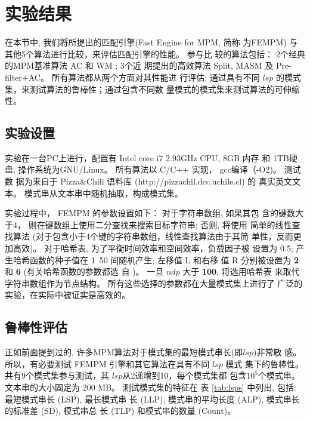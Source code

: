\section{实验结果}
\label{sec:2_experiments}

在本节中, 我们将所提出的匹配引擎(Fast Engine for MPM, 简称
为\textsf{FEMPM}) 与其他5个算法进行比较，来评估匹配引擎的性能。 参与比
较的算法包括： 2个经典的MPM基准算法 \textsf{AC} 和 \textsf{WM} ; 3个近
期提出的高效算法 \textsf{Split},
\textsf{MASM} 及 \textsf{Pre-filter+AC}。 所有算法都从两个方面对其性能进
行评估: 通过具有不同 $lsp$ 的模式集，来测试算法的鲁棒性；通过包含不同数
量模式的模式集来测试算法的可伸缩性。

\subsection{实验设置}


实验在一台PC上进行，配置有 Intel core i7 2.93GHz CPU, 8GB 内存 和 1TB硬
盘, 操作系统为GNU/Linux。 所有算法以 C/C++ 实现， gcc编译（-O2)。 测试数
据为来自于 Pizza\;\&\;Chili 语料库 (http://pizzachil.dcc.uchile.cl) 的
真实英文文本。 模式串从文本串中随机抽取，构成模式集。

实验过程中， \textsf{FEMPM} 的参数设置如下： 对于字符串数组, 如果其包
含的键数大于4， 则在键数组上使用二分查找来搜索目标字符串; 否则, 将使用
简单的线性查找算法 (对于包含小于4个键的字符串数组，线性查找算法由于其简
单性，反而更加高效)。 对于哈希表, 为了平衡时间效率和空间效率，负载因子被
设置为 {0.5}; 产生哈希函数的种子值在 1~50 间随机产生; 左移值 L 和右移
值 R 分别被设置为 \textbf{2} 和 \textbf{6} (有关哈希函数的参数都选
自 \cite{Ramakrishna1997})。 一旦 $ndp$ 大于 \textbf{100}, 将选用哈希表
来取代字符串数组作为节点结构。 所有这些选择的参数都在大量模式集上进行了
广泛的实验，在实际中被证实是高效的。

\subsection{鲁棒性评估}

正如前面提到过的, 许多MPM算法对于模式集的最短模式串长(即$lsp$)非常敏
感。 所以，有必要测试 \textsf{FEMPM} 引擎和其它算法在具有不同 $lsp$ 模式
集下的鲁棒性。 共有9个模式集参与测试，其 $lsp$从2递增到10，每个模式集都
包含$10^5$个模式串。 文本串的大小固定为 200 MB。 测试模式集的特征在
表 \ref{tab:lsps} 中列出, 包括: 最短模式串长 (LSP), 最长模式串
长 (LLP), 模式串的平均长度 (ALP), 模式串长的标准差 (SD), 模式串总
长 (TLP) 和模式串的数量 (Count)。

